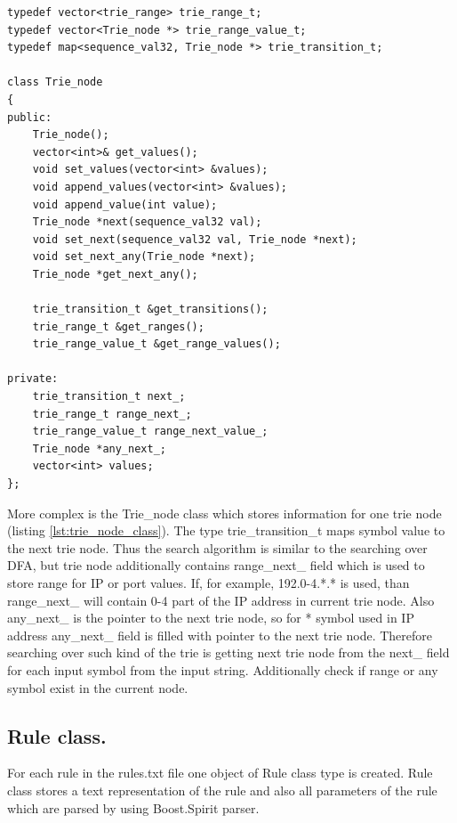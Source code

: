 \documentclass[thesis=M,english]{FITthesis}[2011/07/15]
\begin{document}
\begin{lstlisting}
typedef vector<trie_range> trie_range_t;
typedef vector<Trie_node *> trie_range_value_t;
typedef map<sequence_val32, Trie_node *> trie_transition_t;

class Trie_node
{
public:
    Trie_node();
    vector<int>& get_values();
    void set_values(vector<int> &values);
    void append_values(vector<int> &values);
    void append_value(int value);
    Trie_node *next(sequence_val32 val);
    void set_next(sequence_val32 val, Trie_node *next);
    void set_next_any(Trie_node *next);
    Trie_node *get_next_any();

    trie_transition_t &get_transitions();
    trie_range_t &get_ranges();
    trie_range_value_t &get_range_values();

private:
    trie_transition_t next_;
    trie_range_t range_next_;
    trie_range_value_t range_next_value_;
    Trie_node *any_next_;
    vector<int> values;
};
\end{lstlisting}

More complex is the Trie\_node class which stores information for one trie node (listing \ref{lst:trie_node_class}). The type trie\_transition\_t maps symbol value to the next trie node. Thus the search algorithm is similar to the searching over DFA, but trie node additionally contains range\_next\_ field which is used to store range for IP or port values. If, for example, 192.0-4.*.* is used, than range\_next\_ will contain 0-4 part of the IP address in current trie node. Also any\_next\_ is the pointer to the next trie node, so for * symbol used in IP address any\_next\_ field is filled with pointer to the next trie node. Therefore searching over such kind of the trie is getting next trie node from the next\_ field for each input symbol from the input string. Additionally check if range or any symbol exist in the current node.

\subsection{Rule class.}
For each rule in the rules.txt file one object of Rule class type is created. Rule class stores a text representation of the rule and also all parameters of the rule which are parsed by using Boost.Spirit parser.
\end{document}
